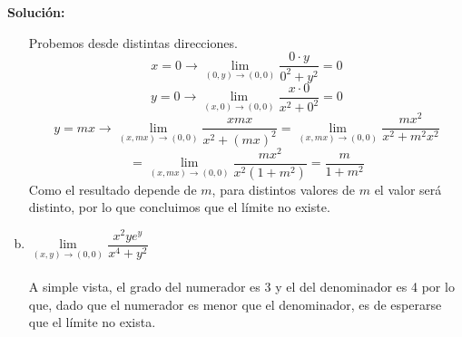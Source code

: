 \documentclass[12pt]{article}
\newenvironment{solucion}
{\begin{mdframed}[backgroundcolor=black!10]
		{\bf Solución:}\\
	}
	{
	\end{mdframed}
}
\newenvironment{preguntas}
{\begin{enumerate}\itemsep12pt
	}
	{
	\end{enumerate}
}
\newcommand{\ra}{\rightarrow}
\begin{document}
\begin{preguntas}
\begin{solucion}
\begin{enumerate}[a)]
			Probemos desde distintas direcciones.
			$$x = 0 \ra \lim\limits_{(0,y) \to (0,0)} \dfrac{0\cdot y}{0^2+y^2} = 0$$
			$$y = 0 \ra \lim\limits_{(x,0) \to (0,0)} \dfrac{x\cdot 0}{x^2+0^2} = 0$$
			$$y = mx \ra \lim\limits_{(x,mx) \to (0,0)} \dfrac{x mx}{x^2+(mx)^2}
			= \lim\limits_{(x,mx) \to (0,0)} \dfrac{mx^2}{x^2+m^2x^2}$$
			$$ = \lim\limits_{(x,mx) \to (0,0)} \dfrac{mx^2}{x^2(1+m^2)}
			= \dfrac{m}{1+m^2}$$
			Como el resultado depende de $m$, para distintos valores de $m$ el valor será distinto, por lo que concluimos que el límite no existe.
\item $\lim\limits_{(x,y) \to (0,0)} \dfrac{x^2ye^y}{x^4+y^2}$\\
			\\
			A simple vista, el grado del numerador es 3 y el del denominador es 4 por lo que, dado que el numerador es menor que el denominador, es de esperarse que el límite no exista.
			

\end{enumerate}
\end{solucion}
\end{preguntas}
\end{document}
